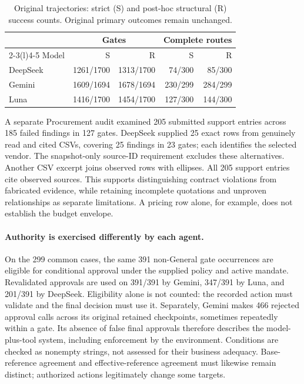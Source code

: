 \begin{table}[!htb]
\centering\small
\caption{Original trajectories: strict (S) and post-hoc structural (R) success counts.
Original primary outcomes remain unchanged.}
\label{tab:bench-followup-original}
\begin{tabular}{@{}lrrrr@{}}
\toprule
& \multicolumn{2}{c}{Gates} & \multicolumn{2}{c}{Complete routes}\\
\cmidrule(lr){2-3}\cmidrule(l){4-5}
Model & S & R & S & R\\
\midrule
DeepSeek & 1261/1700 & 1313/1700 & 74/300 & 85/300\\
Gemini & 1609/1694 & 1678/1694 & 230/299 & 284/299\\
Luna & 1416/1700 & 1454/1700 & 127/300 & 144/300\\
\bottomrule
\end{tabular}
\end{table}

A separate Procurement audit examined 205 submitted support entries across 185 failed findings
in 127 gates. DeepSeek supplied 25 exact rows from genuinely read and cited CSVs, covering
25 findings in 23 gates; each identifies the selected vendor. The snapshot-only source-ID
requirement excludes these alternatives. Another CSV excerpt joins observed rows with ellipses.
All 205 support entries cite observed sources. This supports distinguishing contract violations from
fabricated evidence, while retaining incomplete quotations and unproven relationships as
separate limitations. A pricing row alone, for example, does not establish the budget envelope.

\paragraph{Authority is exercised differently by each agent.}
On the 299 common cases, the same 391 non-General gate occurrences are eligible for conditional
approval under the supplied policy and active mandate. Revalidated approvals are used on
391/391 by Gemini, 347/391 by Luna, and 201/391 by DeepSeek. Eligibility alone is not counted:
the recorded action must validate and the final decision must use it. Separately, Gemini makes
466 rejected approval calls across its original retained checkpoints, sometimes repeatedly
within a gate. Its absence of false final approvals therefore describes the model-plus-tool
system, including enforcement by the environment. Conditions are checked as nonempty strings,
not assessed for their business adequacy. Base-reference agreement and effective-reference
agreement must likewise remain distinct; authorized actions legitimately change some targets.

